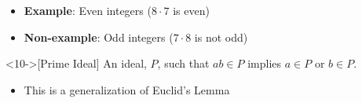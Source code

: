 \begin{frame}[t]
\begin{overprint}
		\begin{itemize}
			\item<8-> \textbf{Example}: Even integers ($8 \cdot 7$ is even)
			\item<9-> \textbf{Non-example}: Odd integers ($7 \cdot 8$ is not odd)
		\end{itemize}

		\medskip

		\begin{definition}<10->[Prime Ideal]
			An ideal, $P$, such that $ab \in P$ implies $a \in P$ or $b \in P$.
		\end{definition}

		\begin{itemize}
			\item<11-> This is a generalization of Euclid's Lemma
		\end{itemize}


	\end{overprint}
\end{frame}

